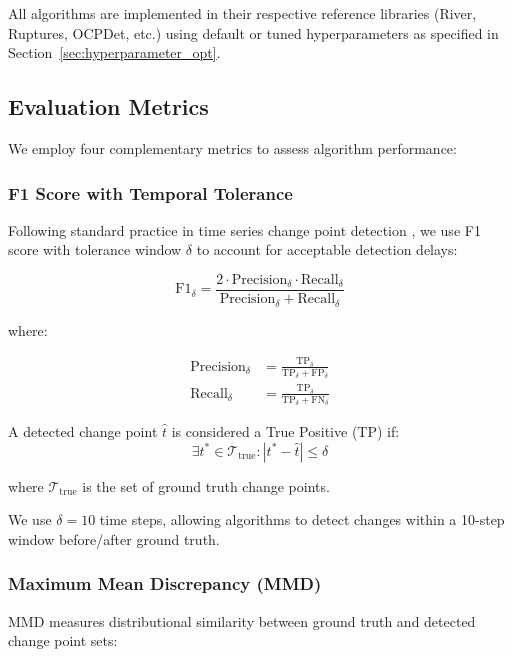 \documentclass[journal,article,submit,pdftex,moreauthors]{Definitions/mdpi}
\begin{document}
All algorithms are implemented in their respective reference libraries (River, Ruptures, OCPDet, etc.) using default or tuned hyperparameters as specified in Section~\ref{sec:hyperparameter_opt}.

\subsection{Evaluation Metrics}
\label{sec:metrics}

We employ four complementary metrics to assess algorithm performance:

\subsubsection{F1 Score with Temporal Tolerance}

Following standard practice in time series change point detection \cite{arlot2019kernel}, we use F1 score with tolerance window $\delta$ to account for acceptable detection delays:

\begin{equation}
\text{F1}_\delta = \frac{2 \cdot \text{Precision}_\delta \cdot \text{Recall}_\delta}{\text{Precision}_\delta + \text{Recall}_\delta}
\end{equation}

where:

\begin{align}
\text{Precision}_\delta &= \frac{\text{TP}_\delta}{\text{TP}_\delta + \text{FP}_\delta} \\
\text{Recall}_\delta &= \frac{\text{TP}_\delta}{\text{TP}_\delta + \text{FN}_\delta}
\end{align}

A detected change point $\hat{t}$ is considered a True Positive (TP) if:
\begin{equation}
\exists t^* \in \mathcal{T}_{\text{true}} : |t^* - \hat{t}| \leq \delta
\end{equation}

where $\mathcal{T}_{\text{true}}$ is the set of ground truth change points.

We use $\delta = 10$ time steps, allowing algorithms to detect changes within a 10-step window before/after ground truth.

\subsubsection{Maximum Mean Discrepancy (MMD)}

MMD measures distributional similarity between ground truth and detected change point sets:
\end{document}
